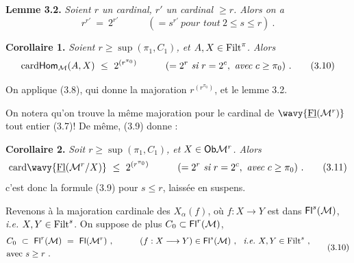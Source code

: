 \textbf{Lemme 3.2.} \textit{Soient $r$ un cardinal, $r'$ un cardinal $\geq r$. Alors on a}
\[
r^{r'}\ =\ 2^{r'}\qquad\quad(=s^{r'}\ \textit{pour tout}\ 2\leq s\leq r)\ .
\]

\textbf{Corollaire 1.} \textit{Soient $r\geq\sup(\pi_1,C_1)$, et $A,X\in\mathrm{Filt}^\pi$. Alors}
\[
\card\Hom_{\M}(A,X)\ \leq\ 2^{(r^{\pi_0})}\qquad\quad(=2^r\ \textit{si}\ r=2^c,\ \textit{avec}\ c\geq\pi_0)\ . \tag*{(3.10)}
\]

On applique (3.8), qui donne la majoration $r^{(r^{\pi_0})}$, et le lemme 3.2.

On notera qu'on trouve la même majoration pour le cardinal de $\wavy{\uFl(\M^r)}$ tout entier (3.7)! De même, (3.9) donne :

\textbf{Corollaire 2.} \textit{Soit $r\geq\sup(\pi_1,C_1)$, et $X\in\mathsf{Ob}\mathcal{M}^r$. Alors}
\[
\card\wavy{\uFl(\M^r/X)}\ \leq\ 2^{(r^{\pi_0})}\qquad\quad(=2^r\ \textit{si}\ r=2^c,\ \textit{avec}\ c\geq\pi_0)\ . \tag*{(3.11)}
\]
c'est donc la formule (3.9) pour $s\leq r$, laissée en suspens.

Revenons à la majoration cardinale des $X_\alpha(f)$, où $f : X\longrightarrow Y$ est dans $\mathsf{Fl}^s(\mathcal{M})$, \textit{i.e.} $X,Y\in\mathrm{Filt}^s$. On suppose de plus $C_0\subset\mathsf{Fl}^r(\mathcal{M})$,
\[
\begin{aligned}
&C_0\ \subset\ \Fl^r(\M)\ =\ \Fl(\M^r)\ ,\qquad\quad(f:X\longrightarrow Y)\in\Fl^s(\M)\ ,\ \ \textit{i.e.}\ X,Y\in\Filt^s\ ,\\
&\text{avec } s\geq r\ .
\end{aligned} \tag*{(3.10)}
\]

